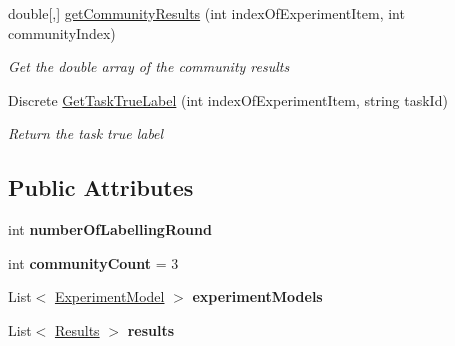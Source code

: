 \begin{DoxyCompactItemize}
double\mbox{[},\mbox{]} \hyperlink{class_acrive_crowd_g_u_i_1_1_experiment_setting_ae7a4dc5056b55a7ec74e10aac997e51d}{get\+Community\+Results} (int index\+Of\+Experiment\+Item, int community\+Index)
\begin{DoxyCompactList}\small\item\em Get the double array of the community results \end{DoxyCompactList}\item 
Discrete \hyperlink{class_acrive_crowd_g_u_i_1_1_experiment_setting_ad08ec4edd36b91cf4b26837837d17c5e}{Get\+Task\+True\+Label} (int index\+Of\+Experiment\+Item, string task\+Id)
\begin{DoxyCompactList}\small\item\em Return the task true label \end{DoxyCompactList}\end{DoxyCompactItemize}
\subsection*{Public Attributes}
\begin{DoxyCompactItemize}
\item 
\hypertarget{class_acrive_crowd_g_u_i_1_1_experiment_setting_a743640b8fb44164d04834f6210fe7b9f}{}int {\bfseries number\+Of\+Labelling\+Round}\label{class_acrive_crowd_g_u_i_1_1_experiment_setting_a743640b8fb44164d04834f6210fe7b9f}

\item 
\hypertarget{class_acrive_crowd_g_u_i_1_1_experiment_setting_ac953dec97e304b79d6ec605dba07ff73}{}int {\bfseries community\+Count} = 3\label{class_acrive_crowd_g_u_i_1_1_experiment_setting_ac953dec97e304b79d6ec605dba07ff73}

\item 
\hypertarget{class_acrive_crowd_g_u_i_1_1_experiment_setting_a5120328c9db97b30317f5fc7b88b1112}{}List$<$ \hyperlink{class_acrive_crowd_g_u_i_1_1_experiment_model}{Experiment\+Model} $>$ {\bfseries experiment\+Models}\label{class_acrive_crowd_g_u_i_1_1_experiment_setting_a5120328c9db97b30317f5fc7b88b1112}

\item 
\hypertarget{class_acrive_crowd_g_u_i_1_1_experiment_setting_aa0cbb4d68dc746ab5fcdb69e4655215d}{}List$<$ \hyperlink{class_crowdsourcing_models_1_1_results}{Results} $>$ {\bfseries results}\label{class_acrive_crowd_g_u_i_1_1_experiment_setting_aa0cbb4d68dc746ab5fcdb69e4655215d}

\end{DoxyCompactItemize}
